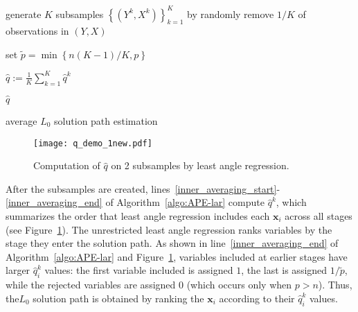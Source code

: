 \documentclass[11pt,review,authoryear]{elsarticle}
\begin{document}
\smallskip
\begin{algorithm}[ht]


  \smallskip

  generate $K$ subsamples $\left\{ \left( Y^k, X^k \right) \right\}^{K}_{k=1}$ by randomly remove $1/K$ of observations in $\left( Y, X \right)$\;

  set $\widetilde{p} = \min\left\{ n\left(K-1\right)/K, p \right\}$\;


  $\widehat{q} := \frac{1}{K} \sum_{k=1}^{K} \widehat{q}^k$\; 

  \Return $\widehat{q}$

\caption{average $L_0$ solution path estimation \label{algo:APE-lar}}

\end{algorithm}


\begin{figure}[ht]
%
  \centering
%
  \texttt{[image: q\_demo\_1new.pdf]}
%
  \caption{Computation of $\widehat{q}$ on 2 subsamples by least angle regression.}
%
  \label{fig:q_demo}
%
\end{figure}

After the subsamples are created, lines~\ref{inner_averaging_start}-\ref{inner_averaging_end} of Algorithm~\ref{algo:APE-lar} compute $\widehat{q}^k$, which summarizes the order that least angle regression includes each $\mathbf{x}_i$ across all stages (see Figure~\ref{fig:q_demo}). The unrestricted least angle regression ranks variables by the stage they enter the solution path. As shown in line~\ref{inner_averaging_end} of Algorithm~\ref{algo:APE-lar} and Figure~\ref{fig:q_demo}, variables included at earlier stages have larger $\widehat{q}^k_i$ values: the first variable included is assigned $1$, the last is assigned $1/\widetilde{p}$, while the rejected variables are assigned $0$ (which occurs only when $p > n$). Thus, the$L_0$ solution path is obtained by ranking the $\mathbf{x}_i$ according to their $\widehat{q}^k_i$ values.
\end{document}
